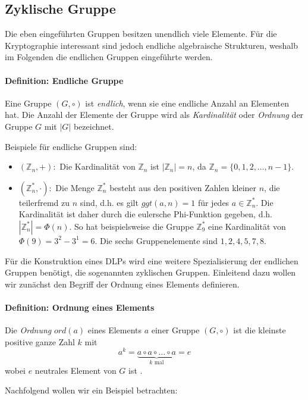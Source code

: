 \subsection{Zyklische Gruppe} \label{sec:zyklische_Gruppe}
Die eben eingeführten Gruppen besitzen unendlich viele Elemente. Für die Kryptographie interessant sind jedoch endliche algebraische Strukturen, weshalb im Folgenden die endlichen Gruppen eingeführte werden.

\paragraph{Definition: Endliche Gruppe}
Eine Gruppe $(G, \circ)$ ist \textit{endlich}, wenn sie eine endliche Anzahl an Elementen hat. Die Anzahl der Elemente der Gruppe wird als 
\textit{Kardinalität} oder \textit{Ordnung} der Gruppe $G$ mit $|G|$ bezeichnet\cite[S. 241]{Paar.2016}.

Beispiele für endliche Gruppen sind:
\begin{itemize}
\item $(\mathbb{Z}_n, +):$ Die Kardinalität von $\mathbb{Z}_n$ ist $|\mathbb{Z}_n| = n$, da $\mathbb{Z}_n = \{0,1,2,\dots ,n-1\}$.
\item $(\mathbb{Z}^*_n, \cdot):$ Die Menge $\mathbb{Z}^*_n$ besteht aus den positiven Zahlen kleiner $n$, die teilerfremd zu $n$ sind, d.h. es gilt $ggt(a,n) = 1$ für jedes $a \in \mathbb{Z}^*_n$. Die Kardinalität ist daher durch die eulersche Phi-Funktion gegeben, d.h. $|\mathbb{Z}^*_n| = \Phi(n)$. So hat beispielsweise die Gruppe $\mathbb{Z}^*_9$ eine Kardinalität von $\Phi(9) = 3^2 - 3^1 = 6$. Die sechs Gruppenelemente sind ${1,2,4,5,7,8}$.
\end{itemize}

Für die Konstruktion eines DLPs wird eine weitere Spezialisierung der endlichen Gruppen benötigt, die sogenannten zyklischen Gruppen. Einleitend dazu wollen wir zunächst den Begriff der Ordnung eines Elements definieren.

\paragraph{Definition: Ordnung eines Elements}
Die \textit{Ordnung}  $ord(a)$ eines Elements $a$ einer Gruppe $(G, \circ)$ ist die kleinste positive ganze Zahl $k$ mit $$a^k = \underbrace{a \circ a \circ \dots \circ a}_{\text{$k$ mal}} = e$$ wobei $e$ neutrales Element von $G$ ist \cite[S. 241]{Paar.2016}.

Nachfolgend wollen wir ein Beispiel betrachten:

